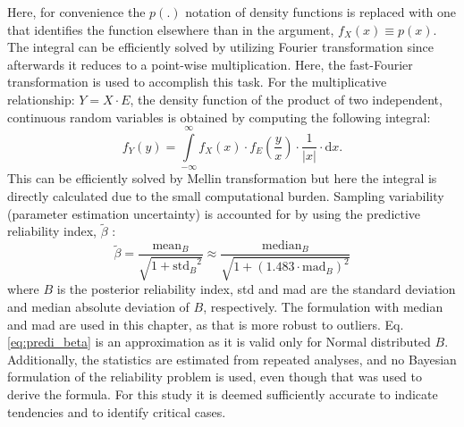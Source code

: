 Here, for convenience the $p(.)$ notation of density functions is replaced with one that identifies the function elsewhere than in the argument, $f_X(x) \equiv p(x)$.
The integral can be efficiently solved by utilizing Fourier transformation since afterwards it reduces to a point-wise multiplication. Here, the fast-Fourier transformation is used to accomplish this task. For the multiplicative relationship: $Y = X \cdot E$, the density function of the product of two independent, continuous random variables is obtained by computing the following integral:
\begin{equation}
\label{eq:prod}
	{f_Y}\left( y \right) = \int\limits_{ - \infty }^\infty  {{f_X}\left( x \right)}  \cdot {f_E}\left( {\frac{y}{x}} \right) \cdot \frac{1}{{\left| x \right|}} \cdot {\mathrm{d}}x.
\end{equation}
This can be efficiently solved by Mellin transformation but here the integral is directly calculated due to the small computational burden.
Sampling variability (parameter estimation uncertainty) is accounted for by using the predictive reliability index, $\tilde \beta$ \citep{Kiureghian1989}:
\begin{equation}
\label{eq:predi_beta}
	 \tilde \beta  = \frac{{{{\mathrm{mean}}_B}}}{{\sqrt {1 + {{\mathrm{std}}_B}^2} }} \approx \frac{{{\mathrm{median}_B}}}{{\sqrt {1 + {{\left( {1.483 \cdot {{\mathrm{mad}}_B}} \right)}^2}} }}
\end{equation}
where $B$ is the posterior reliability index, std and mad are the standard deviation and median absolute deviation of $B$, respectively. The formulation with median and mad are used in this chapter, as that is more robust to outliers. Eq.\ref{eq:predi_beta} is an approximation as it is valid only for Normal distributed $B$. Additionally, the statistics are estimated from repeated analyses, and no Bayesian formulation of the reliability problem is used, even though that was used to derive the formula. For this study it is deemed sufficiently accurate to indicate tendencies and to identify critical cases.
